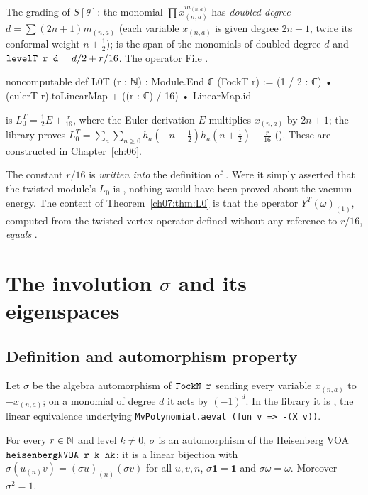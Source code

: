 The grading of $S[\theta]$: the monomial $\prod x_{(n,a)}^{m_{(n,a)}}$ has \emph{doubled degree}
$d = \sum (2n+1)m_{(n,a)}$ (each variable $x_{(n,a)}$ is given degree $2n+1$, twice its conformal weight $n+\frac12$);  is the span of the monomials of doubled degree $d$
and $\lean{levelT r d} = d/2 + r/16$. The operator
\noindent File .
\begin{leancode}
noncomputable def L0T (r : ℕ) : Module.End ℂ (FockT r) :=
  (1 / 2 : ℂ) • (eulerT r).toLinearMap + ((r : ℂ) / 16) • LinearMap.id
\end{leancode}
is $L_0^T = \frac12 E + \frac r{16}$, where the Euler derivation $E$ multiplies $x_{(n,a)}$ by
$2n+1$; the library proves $L_0^T = \sum_a\sum_{n\ge0}h_a(-n-\frac12)h_a(n+\frac12) +
\frac r{16}$ (). These are constructed in Chapter~\ref{ch:06}.

\begin{warning}
The constant $r/16$ is \emph{written into} the definition of . Were it simply
asserted that the twisted module's $L_0$ is , nothing would have been proved about the
vacuum energy. The content of Theorem~\ref{ch07:thm:L0} is that the operator
$Y^T(\omega)_{(1)}$, computed from the twisted vertex operator defined without any reference to
$r/16$, \emph{equals} .
\end{warning}

\section{The involution \texorpdfstring{$\sigma$}{sigma} and its eigenspaces}\label{ch07:sec:sigma}

\subsection{Definition and automorphism property}

Let $\sigma$ be the algebra automorphism of $\lean{FockN r}$ sending every variable $x_{(n,a)}$
to $-x_{(n,a)}$; on a monomial of degree $d$ it acts by $(-1)^d$. In the library it is
, the linear equivalence underlying
\verb|MvPolynomial.aeval (fun v => -(X v))|.

\begin{theorem}\label{ch07:thm:sigmaaut}
For every $r\in{\mathbb{N}}$ and level $k\ne0$, $\sigma$ is an automorphism of the Heisenberg VOA
$\lean{heisenbergNVOA r k hk}$: it is a linear bijection with $\sigma(u_{(n)}v) =
(\sigma u)_{(n)}(\sigma v)$ for all $u,v,n$, $\sigma\mathbf 1 = \mathbf 1$ and $\sigma\omega
=\omega$. Moreover $\sigma^2 = 1$.
\end{theorem}

